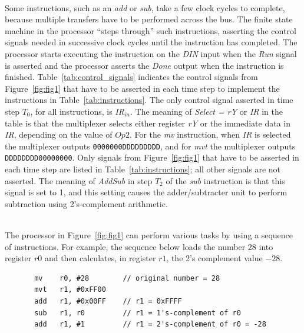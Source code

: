 \documentclass[epsfig,10pt,fullpage]{article}
\begin{document}
~\\
Some instructions, such as an {\it add} or {\it sub}, take a few clock cycles to complete, 
because multiple transfers have to be performed across the bus. The finite state machine in the 
processor ``steps through'' such instructions, asserting the control signals needed in 
successive clock cycles until the instruction has completed.  The processor starts executing 
the instruction on the {\it DIN} input when the {\it Run} signal is asserted and the processor 
asserts the {\it Done} output when the instruction is finished.  Table~\ref{tab:control_signals}
indicates the control signals from Figure~\ref{fig:fig1} that have to be 
asserted in each time step to implement the instructions in Table~\ref{tab:instructions}.  The 
only control signal asserted in time step $T_0$, for all instructions, is {\it IR}$_{in}$. 
The meaning of {\it Select = rY} or {\it IR} in the table is that the multiplexer selects 
either register {\it rY} or the immediate data in {\it IR}, depending on the value of $Op2$.
For the {\it mv} instruction, when {\it IR} is selected the multiplexer outputs 
\texttt{0000000DDDDDDDDD}, and for {\it mvt} the multiplexer outputs \texttt{DDDDDDDD00000000}.
Only signals from Figure~\ref{fig:fig1} that have to be asserted in each time 
step are listed in Table~\ref{tab:instructions}; all other signals are not asserted. The 
meaning of {\it AddSub} in step $T_2$ of the {\it sub} instruction is that this signal is set 
to 1, and this setting causes the adder/subtracter unit to perform subtraction using 
2's-complement arithmetic.

~\\
The processor in Figure~\ref{fig:fig1} can perform various tasks by using a sequence of 
instructions. For example, the sequence below loads the number 28 into register $r0$ and then 
calculates, in register $r1$, the 2's complement value $-28$.

\begin{minipage}[t]{15 cm}
\begin{lstlisting}
       mv    r0, #28        // original number = 28
       mvt   r1, #0xFF00
       add   r1, #0x00FF    // r1 = 0xFFFF
       sub   r1, r0         // r1 = 1's-complement of r0
       add   r1, #1         // r1 = 2's-complement of r0 = -28
\end{lstlisting}
\end{minipage}
\end{document}
